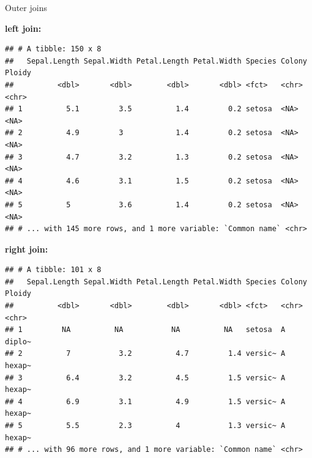 \documentclass[14pt,ignorenonframetext,]{bredelebeamer}
\newenvironment{Shaded}{\begin{snugshade}}{\end{snugshade}}
\newcommand{\KeywordTok}[1]{\textcolor[rgb]{0.94,0.87,0.69}{#1}}
\newcommand{\DataTypeTok}[1]{\textcolor[rgb]{0.87,0.87,0.75}{#1}}
\newcommand{\DecValTok}[1]{\textcolor[rgb]{0.86,0.86,0.80}{#1}}
\newcommand{\StringTok}[1]{\textcolor[rgb]{0.80,0.58,0.58}{#1}}
\newcommand{\OperatorTok}[1]{\textcolor[rgb]{0.94,0.94,0.82}{#1}}
\newcommand{\NormalTok}[1]{\textcolor[rgb]{0.80,0.80,0.80}{#1}}
\begin{document}
\begin{frame}[fragile]{Outer joins}

\small
\textbf{left join:}

\begin{Shaded}
\end{Shaded}

\begin{verbatim}
## # A tibble: 150 x 8
##   Sepal.Length Sepal.Width Petal.Length Petal.Width Species Colony Ploidy
##          <dbl>       <dbl>        <dbl>       <dbl> <fct>   <chr>  <chr> 
## 1          5.1         3.5          1.4         0.2 setosa  <NA>   <NA>  
## 2          4.9         3            1.4         0.2 setosa  <NA>   <NA>  
## 3          4.7         3.2          1.3         0.2 setosa  <NA>   <NA>  
## 4          4.6         3.1          1.5         0.2 setosa  <NA>   <NA>  
## 5          5           3.6          1.4         0.2 setosa  <NA>   <NA>  
## # ... with 145 more rows, and 1 more variable: `Common name` <chr>
\end{verbatim}

\textbf{right join:}

\begin{Shaded}
\end{Shaded}

\begin{verbatim}
## # A tibble: 101 x 8
##   Sepal.Length Sepal.Width Petal.Length Petal.Width Species Colony Ploidy
##          <dbl>       <dbl>        <dbl>       <dbl> <fct>   <chr>  <chr> 
## 1         NA          NA           NA          NA   setosa  A      diplo~
## 2          7           3.2          4.7         1.4 versic~ A      hexap~
## 3          6.4         3.2          4.5         1.5 versic~ A      hexap~
## 4          6.9         3.1          4.9         1.5 versic~ A      hexap~
## 5          5.5         2.3          4           1.3 versic~ A      hexap~
## # ... with 96 more rows, and 1 more variable: `Common name` <chr>
\end{verbatim}

\end{frame}
\end{document}
